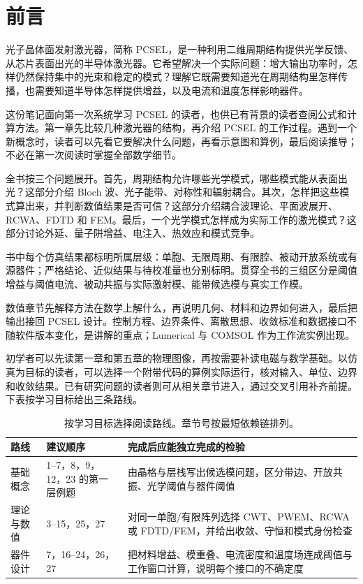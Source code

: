 \chapter*{前言}
\label{ch:preface}

光子晶体面发射激光器，简称 PCSEL，是一种利用二维周期结构提供光学反馈、从芯片表面出光的半导体激光器。它希望解决一个实际问题：增大输出功率时，怎样仍然保持集中的光束和稳定的模式？理解它既需要知道光在周期结构里怎样传播，也需要知道半导体怎样提供增益，以及电流和温度怎样影响器件。

这份笔记面向第一次系统学习 PCSEL 的读者，也供已有背景的读者查阅公式和计算方法。第一章先比较几种激光器的结构，再介绍 PCSEL 的工作过程。遇到一个新概念时，读者可以先看它要解决什么问题，再看示意图和算例，最后阅读推导；不必在第一次阅读时掌握全部数学细节。

全书按三个问题展开。首先，周期结构允许哪些光学模式，哪些模式能从表面出光？这部分介绍 Bloch 波、光子能带、对称性和辐射耦合。其次，怎样把这些模式算出来，并判断数值结果是否可信？这部分介绍耦合波理论、平面波展开、RCWA、FDTD 和 FEM。最后，一个光学模式怎样成为实际工作的激光模式？这部分讨论外延、量子阱增益、电注入、热效应和模式竞争。

书中每个仿真结果都标明所属层级：单胞、无限周期、有限腔、被动开放系统或有源器件；严格结论、近似结果与待校准量也分别标明。贯穿全书的三组区分是阈值增益与阈值电流、被动共振与实际激射模、能带候选模与真实工作模。

数值章节先解释方法在数学上解什么，再说明几何、材料和边界如何进入，最后把输出接回 PCSEL 设计。控制方程、边界条件、离散思想、收敛标准和数据接口不随软件版本变化，是讲解的重点；Lumerical 与 COMSOL 作为工作流实例出现。

初学者可以先读第一章和第五章的物理图像，再按需要补读电磁与数学基础。以仿真为目标的读者，可以选择一个附带代码的算例实际运行，核对输入、单位、边界和收敛结果。已有研究问题的读者则可从相关章节进入，通过交叉引用补齐前提。下表按学习目标给出三条路线。

\begin{table}[htbp]
  \centering
  \small
  \caption{按学习目标选择阅读路线。章节号按最短依赖链排列。}
  \label{tab:reading_routes}
  \begin{tabularx}{\textwidth}{@{}p{2.3cm}p{5.0cm}Y@{}}
    \toprule
    路线 & 建议顺序 & 完成后应能独立完成的检验 \\ \midrule
    基础概念 & 1--7，8，9，12，23 的第一层例题 & 由晶格与层栈写出候选模问题，区分带边、开放共振、光学阈值与器件阈值 \\
    理论与数值 & 3--15，25，27 & 对同一单胞/有限阵列选择 CWT、PWEM、RCWA 或 FDTD/FEM，并给出收敛、守恒和模式身份检查 \\
    器件设计 & 7，16--24，26，27 & 把材料增益、模重叠、电流密度和温度场连成阈值与工作窗口计算，说明每个接口的不确定度 \\
    \bottomrule
  \end{tabularx}
\end{table}

